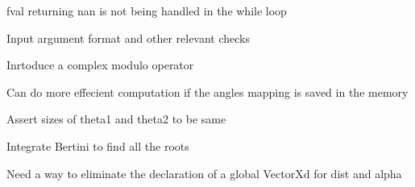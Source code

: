 \begin{DoxyRefList}
fval returning nan is not being handled in the while loop 

Input argument format and other relevant checks  
\item[Member \mbox{\hyperlink{utils_8hh_a5d8b5ec8d7d9f33e2b89dbd54a9dfbd6}{s1\+CDist}} (Vector\+Xcd theta1, Vector\+Xcd theta2)]\label{todo__todo000017}%
%
Inrtoduce a complex modulo operator  
\item[Member \mbox{\hyperlink{utils_8hh_aa55cfeada673b3ce1ce1e504925e117c}{s1\+Dist}} (Vector\+Xd theta1, Vector\+Xd theta2)]\label{todo__todo000016}%
%
Can do more effecient computation if the angles mapping is saved in the memory 

Assert sizes of theta1 and theta2 to be same  
\item[Member \mbox{\hyperlink{root__tracker_8cc_a42a0ca2bc65ca9d6f2c126d8bb319d49}{SEI}} (Matrix\+Xd allroots, double alpha, int selectedroot, std\+::function$<$ Vector\+Xd(double)$>$ compute\+Xfrom\+Param, Ref$<$ Vector\+Xd $>$ alphahist, Ref$<$ Matrix\+Xd $>$ disthist, std\+::function$<$ Vector\+Xd(\+Vector\+Xd)$>$ f, std\+::function$<$ Matrix\+Xd(\+Vector\+Xd)$>$ Jfy)]\label{todo__todo000006}%
%
Integrate Bertini to find all the roots 

Need a way to eliminate the declaration of a global Vector\+Xd for dist and alpha 
\end{DoxyRefList}